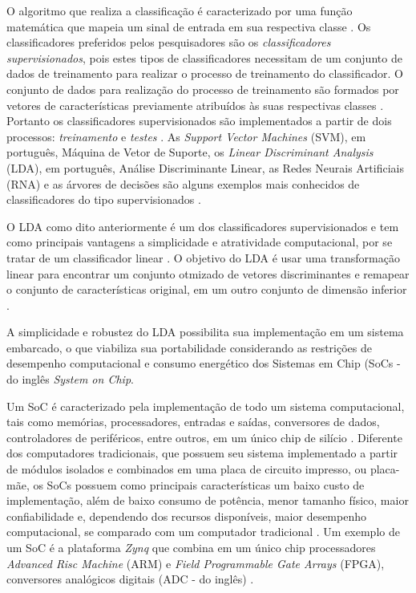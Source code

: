 O algoritmo que realiza a classificação é caracterizado por uma função matemática
que mapeia um sinal de entrada em sua respectiva classe \cite{lottephd}. Os classificadores
preferidos pelos pesquisadores são os \textit{classificadores supervisionados}, pois estes
tipos de classificadores necessitam de um conjunto de dados de treinamento para realizar o processo de treinamento do classificador. O conjunto de dados para realização do processo de treinamento são formados por vetores de características previamente atribuídos às suas respectivas classes \cite{lottephd}. Portanto os classificadores supervisionados são implementados a partir de dois processos: \textit{treinamento} e \textit{testes} \cite{Siulybook}. As \textit{Support Vector Machines} (SVM), em português, Máquina de Vetor de Suporte, os \textit{Linear Discriminant Analysis} (LDA), em português, Análise Discriminante Linear, as Redes Neurais Artificiais (RNA) e as árvores de decisões são alguns exemplos mais conhecidos de classificadores do tipo supervisionados \cite{Siulybook}.

O LDA como dito anteriormente é um dos classificadores supervisionados e tem como principais vantagens
a simplicidade e atratividade computacional, por se tratar de um classificador linear \cite{patternRecogn}.
O objetivo do LDA é usar uma transformação linear para encontrar um conjunto otmizado de vetores
discriminantes e remapear o conjunto de características
original, em um outro conjunto de dimensão  inferior \cite{ShashoaLDA}.

A simplicidade e robustez do LDA possibilita sua implementação em um sistema embarcado, o que viabiliza sua portabilidade considerando as restrições de desempenho computacional e consumo energético dos Sistemas em Chip (SoCs - do inglês \textit{System on Chip}.

Um SoC é caracterizado pela implementação de todo um sistema computacional, tais como memórias, processadores, entradas e saídas, conversores de dados, controladores de periféricos, entre outros, em um único chip de silício \cite{zynqBook}. Diferente dos computadores tradicionais, que possuem seu sistema implementado a partir de módulos isolados e combinados em uma placa de circuito impresso, ou placa-mãe, os SoCs possuem como principais características um baixo custo de implementação, além de baixo consumo de potência, menor tamanho físico, maior confiabilidade e, dependendo dos recursos disponíveis, maior desempenho computacional, se comparado com um computador tradicional \cite{zynqBook}. Um exemplo de um SoC é a plataforma \textit{Zynq} que combina em um único chip processadores \textit{Advanced Risc Machine} (ARM) e \textit{Field Programmable Gate Arrays} (FPGA), conversores analógicos digitais (ADC - do inglês) \cite{zynqBook}. 

